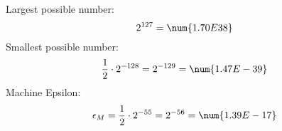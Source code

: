 Largest possible number:
    \begin{equation}
        2^{127} = \num{1.70E38}
    \end{equation}
Smallest possible number:
    \begin{equation}
        \frac{1}{2} \cdot 2^{-128} = 2^{-129} = \num{1.47E-39}
    \end{equation}
Machine Epsilon:
    \begin{equation}
        \epsilon_{M} = \frac{1}{2} \cdot 2^{-55} = 2^{-56} = \num{1.39E-17}
    \end{equation}
